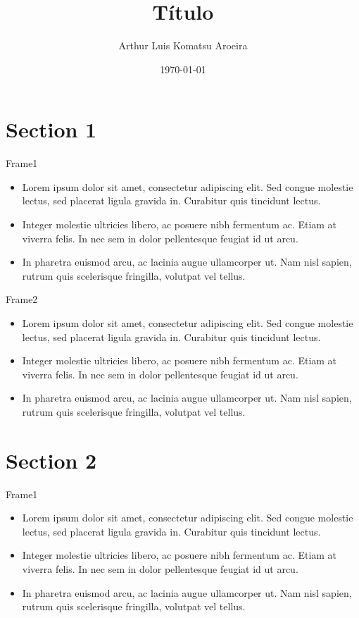 \documentclass[notes, red, mathserif]{beamer}
\title{Título}
\institute{Instituto1
\\ Instituto2\\ Brasil}
\date{\today}
\author[Arthur]
{
  Arthur Luis Komatsu Aroeira
}
\begin{document}
 \frame{\titlepage}

\section{Section 1}

\begin{frame}{Frame1}

	\begin{itemize}[<+->]
		\item Lorem ipsum dolor sit amet, consectetur adipiscing elit. Sed congue molestie lectus, sed placerat ligula gravida in. Curabitur quis tincidunt lectus.
		\item Integer molestie ultricies libero, ac posuere nibh fermentum ac. Etiam at viverra felis. In nec sem in dolor pellentesque feugiat id ut arcu.
		\item In pharetra euismod arcu, ac lacinia augue ullamcorper ut. Nam nisl sapien, rutrum quis scelerisque fringilla, volutpat vel tellus.
	\end{itemize}

\end{frame}

\begin{frame}{Frame2}

	\begin{itemize}[<+->]
		\item Lorem ipsum dolor sit amet, consectetur adipiscing elit. Sed congue molestie lectus, sed placerat ligula gravida in. Curabitur quis tincidunt lectus.
		\item Integer molestie ultricies libero, ac posuere nibh fermentum ac. Etiam at viverra felis. In nec sem in dolor pellentesque feugiat id ut arcu.
		\item In pharetra euismod arcu, ac lacinia augue ullamcorper ut. Nam nisl sapien, rutrum quis scelerisque fringilla, volutpat vel tellus.
	\end{itemize}

\end{frame}

\section{Section 2}

\begin{frame}{Frame1}

	\begin{itemize}[<+->]
		\item Lorem ipsum dolor sit amet, consectetur adipiscing elit. Sed congue molestie lectus, sed placerat ligula gravida in. Curabitur quis tincidunt lectus.
		\item Integer molestie ultricies libero, ac posuere nibh fermentum ac. Etiam at viverra felis. In nec sem in dolor pellentesque feugiat id ut arcu.
		\item In pharetra euismod arcu, ac lacinia augue ullamcorper ut. Nam nisl sapien, rutrum quis scelerisque fringilla, volutpat vel tellus.
	\end{itemize}

\end{frame}
\end{document}
